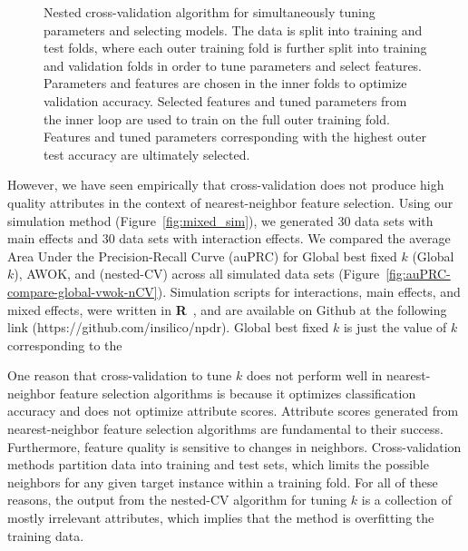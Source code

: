 \documentclass[10pt,letterpaper]{article}
\begin{document}
\begin{figure}[!bht]
	\centering
	\caption{Nested cross-validation algorithm for simultaneously tuning parameters and selecting models. The data is split into training and test folds, where each outer training fold is further split into training and validation folds in order to tune parameters and select features. Parameters and features are chosen in the inner folds to optimize validation accuracy. Selected features and tuned parameters from the inner loop are used to train on the full outer training fold. Features and tuned parameters corresponding with the highest outer test accuracy are ultimately selected.}\label{fig:nCV}
\end{figure}

However, we have seen empirically that cross-validation does not produce high quality attributes in the context of nearest-neighbor feature selection. Using our simulation method (Figure~\ref{fig:mixed_sim}), we generated 30 data sets with main effects and 30 data sets with interaction effects. We compared the average Area Under the Precision-Recall Curve (auPRC) for Global best fixed $k$ (Global $k$), AWOK, and (nested-CV) across all simulated data sets (Figure~\ref{fig:auPRC-compare-global-vwok-nCV}). Simulation scripts for interactions, main effects, and mixed effects, were written in \textbf{\textsf{R}}~\cite{R}, and are available on Github at the following link (https://github.com/insilico/npdr). Global best fixed $k$ is just the value of $k$ corresponding to the 

One reason that cross-validation to tune $k$ does not perform well in nearest-neighbor feature selection algorithms is because it optimizes classification accuracy and does not optimize attribute scores. Attribute scores generated from nearest-neighbor feature selection algorithms are fundamental to their success. Furthermore, feature quality is sensitive to changes in neighbors. Cross-validation methods partition data into training and test sets, which limits the possible neighbors for any given target instance within a training fold. For all of these reasons, the output from the nested-CV algorithm for tuning $k$ is a collection of mostly irrelevant attributes, which implies that the method is overfitting the training data. 
\end{document}
